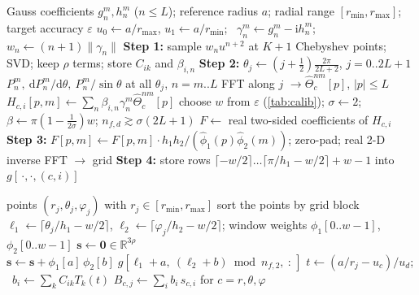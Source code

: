 \documentclass[11pt,a4paper]{article}
\theoremstyle{definition}
\newcommand{\eps}{\varepsilon}
\newcommand{\ii}{\mathrm{i}}
\newcommand{\dd}{\mathrm{d}}
\begin{document}
\begin{algorithm}[!htbp]
\caption{Set-up (once per model and radial range)}\label{alg:setup}
\begin{algorithmic}[1]
\Require Gauss coefficients $g_n^m,h_n^m$ ($n\le L$); reference radius $a$; radial range $[r_{\min},r_{\max}]$; target accuracy $\eps$
\State $u_0\gets a/r_{\max}$, $u_1\gets a/r_{\min}$; \ $\gamma_n^m\gets g_n^m-\ii h_n^m$; \ $w_n\gets(n+1)\|\gamma_n\|$
\State \textbf{Step 1:} sample $w_nu^{n+2}$ at $K+1$ Chebyshev points; SVD; keep $\rho$ terms; store $C_{ik}$ and $\beta_{i,n}$
\State \textbf{Step 2:} $\theta_j\gets(j+\tfrac12)\frac{2\pi}{2L+2}$, $j=0..2L+1$
  \State $P_n^m,\ \dd P_n^m/\dd\theta,\ P_n^m/\sin\theta$ at all $\theta_j$, $n=m..L$ 
  \State FFT along $j$ $\to\widehat\Theta_c^{nm}[p]$, $|p|\le L$
  \State $H_{c,i}[p,m]\gets\sum_n\beta_{i,n}\gamma_n^m\widehat\Theta_c^{nm}[p]$ 
\EndFor
\State choose $w$ from $\eps$ (\cref{tab:calib}); $\sigma\gets2$; $\beta\gets\pi(1-\tfrac1{2\sigma})w$; $n_{f,d}\gtrsim\sigma(2L+1)$
  \State $F\gets$ real two-sided coefficients of $H_{c,i}$ 
  \State \textbf{Step 3:} $F[p,m]\gets F[p,m]\cdot h_1h_2/(\hat\phi_1(p)\hat\phi_2(m))$; zero-pad; real 2-D inverse FFT $\to$ grid
  \State \textbf{Step 4:} store rows $\lceil-w/2\rceil\dots\lceil\pi/h_1-w/2\rceil+w-1$ into $g[\,\cdot,\cdot,(c,i)]$
\EndFor
\end{algorithmic}
\end{algorithm}

\begin{algorithm}[!htbp]
\caption{Evaluation at $M$ points (Step 5)}\label{alg:eval}
\begin{algorithmic}[1]
\Require points $(r_j,\theta_j,\varphi_j)$ with $r_j\in[r_{\min},r_{\max}]$
\State sort the points by grid block
  \State $\ell_1\gets\lceil\theta_j/h_1-w/2\rceil$, $\ell_2\gets\lceil\varphi_j/h_2-w/2\rceil$; window weights $\phi_1[0..w-1]$, $\phi_2[0..w-1]$
  \State $\mathbf s\gets\mathbf 0\in\mathbb R^{3\rho}$
   
    \State $\mathbf s\gets\mathbf s+\phi_1[a]\,\phi_2[b]\;g[\ell_1+a,\ (\ell_2+b)\bmod n_{f,2},\ :\,]$ 
  \EndFor\EndFor
  \State $t\gets(a/r_j-u_c)/u_d$; \ $b_i\gets\sum_kC_{ik}T_k(t)$
  \State $B_{c,j}\gets\sum_ib_i\,s_{c,i}$ for $c=r,\theta,\varphi$
\EndFor
\end{algorithmic}
\end{algorithm}
\end{document}
